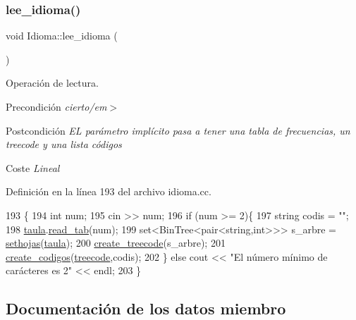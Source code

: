 \subsubsection{\texorpdfstring{lee\+\_\+idioma()}{lee\_idioma()}}
{\footnotesize\ttfamily void Idioma\+::lee\+\_\+idioma (\begin{DoxyParamCaption}{ }\end{DoxyParamCaption})}



Operación de lectura. 

\begin{DoxyPrecond}{Precondición}
{\itshape cierto/em$>$ }
\end{DoxyPrecond}
\begin{DoxyPostcond}{Postcondición}
{\itshape  EL parámetro implícito pasa a tener una tabla de frecuencias, un treecode y una lista códigos }
\end{DoxyPostcond}
\begin{DoxyParagraph}{Coste}
{\itshape  Lineal }
\end{DoxyParagraph}


Definición en la línea 193 del archivo idioma.\+cc.


\begin{DoxyCode}
193                        \{
194     \textcolor{keywordtype}{int} num;
195     cin >> num;
196     \textcolor{keywordflow}{if} (num >= 2)\{
197       \textcolor{keywordtype}{string} codis = \textcolor{stringliteral}{""};
198       \hyperlink{class_idioma_a5e144ffaa4c1c63690e08e4e2687a13f}{taula}.\hyperlink{class_tab_freq_aa84cb3ed7c4958be0bfe4fbd8c6c0e6a}{read\_tab}(num);
199       set<BinTree<pair<string,int>>> s\_arbre = \hyperlink{class_idioma_aa4a86dd82c04a280b32d98c775cf5eda}{sethojas}(\hyperlink{class_idioma_a5e144ffaa4c1c63690e08e4e2687a13f}{taula});
200       \hyperlink{class_idioma_aa26f926dab1f528a879244f0a1c5f3e5}{create\_treecode}(s\_arbre);
201       \hyperlink{class_idioma_a30aeaf1fc288edfcb09a00e47cad834a}{create\_codigos}(\hyperlink{class_idioma_a5eeaf73b2498503c5c686ac259e1f675}{treecode},codis);
202     \} \textcolor{keywordflow}{else} cout << \textcolor{stringliteral}{"El número mínimo de carácteres es 2"} << endl;
203   \}
\end{DoxyCode}


\subsection{Documentación de los datos miembro}
\mbox{\label{class_idioma_a5e144ffaa4c1c63690e08e4e2687a13f}} 
